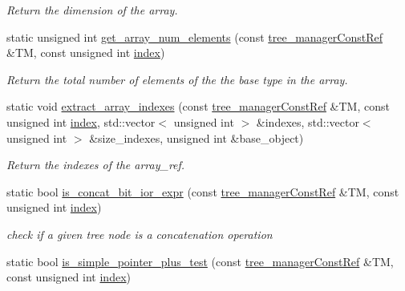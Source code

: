 \begin{DoxyCompactItemize}
\begin{DoxyCompactList}\small\item\em Return the dimension of the array. \end{DoxyCompactList}\item 
static unsigned int \hyperlink{classtree__helper_a81cf8c1b36aa54a55aa4d543425531ab}{get\+\_\+array\+\_\+num\+\_\+elements} (const \hyperlink{tree__manager_8hpp_a792e3f1f892d7d997a8d8a4a12e39346}{tree\+\_\+manager\+Const\+Ref} \&TM, const unsigned int \hyperlink{tutorial__pact__2019_2Introduction_2third_2include_2Keccak_8h_a028c9bdc8344cca38ab522a337074797}{index})
\begin{DoxyCompactList}\small\item\em Return the total number of elements of the the base type in the array. \end{DoxyCompactList}\item 
static void \hyperlink{classtree__helper_a3d546f68902ada6eaeda4ce3c90ae4b8}{extract\+\_\+array\+\_\+indexes} (const \hyperlink{tree__manager_8hpp_a792e3f1f892d7d997a8d8a4a12e39346}{tree\+\_\+manager\+Const\+Ref} \&TM, const unsigned int \hyperlink{tutorial__pact__2019_2Introduction_2third_2include_2Keccak_8h_a028c9bdc8344cca38ab522a337074797}{index}, std\+::vector$<$ unsigned int $>$ \&indexes, std\+::vector$<$ unsigned int $>$ \&size\+\_\+indexes, unsigned int \&base\+\_\+object)
\begin{DoxyCompactList}\small\item\em Return the indexes of the array\+\_\+ref. \end{DoxyCompactList}\item 
static bool \hyperlink{classtree__helper_a206f57e4526ced92c69fa511c2ddc2da}{is\+\_\+concat\+\_\+bit\+\_\+ior\+\_\+expr} (const \hyperlink{tree__manager_8hpp_a792e3f1f892d7d997a8d8a4a12e39346}{tree\+\_\+manager\+Const\+Ref} \&TM, const unsigned int \hyperlink{tutorial__pact__2019_2Introduction_2third_2include_2Keccak_8h_a028c9bdc8344cca38ab522a337074797}{index})
\begin{DoxyCompactList}\small\item\em check if a given tree node is a concatenation operation \end{DoxyCompactList}\item 
static bool \hyperlink{classtree__helper_a82b336f89ab98b3512e1cc607aef4825}{is\+\_\+simple\+\_\+pointer\+\_\+plus\+\_\+test} (const \hyperlink{tree__manager_8hpp_a792e3f1f892d7d997a8d8a4a12e39346}{tree\+\_\+manager\+Const\+Ref} \&TM, const unsigned int \hyperlink{tutorial__pact__2019_2Introduction_2third_2include_2Keccak_8h_a028c9bdc8344cca38ab522a337074797}{index})

\end{DoxyCompactItemize}
